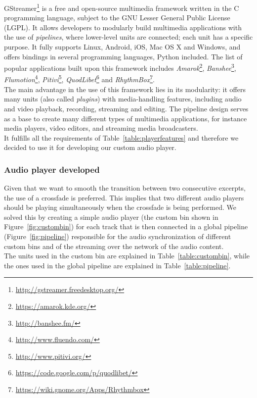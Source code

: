 GStreamer\footnote{\url{http://gstreamer.freedesktop.org/}} is a free and open-source multimedia framework written in the C programming language, subject to the GNU Lesser General Public License (LGPL). It allows developers to modularly build multimedia applications with the use of \textit{pipelines}, where lower-level units are connected; each unit has a specific purpose. It fully supports Linux, Android, iOS, Mac OS X and Windows, and offers bindings in several programming languages, Python included. The list of popular applications built upon this framework includes \textit{Amarok}\footnote{\url{https://amarok.kde.org/}}, \textit{Banshee}\footnote{\url{http://banshee.fm/}}, \textit{Flumotion}\footnote{\url{http://www.fluendo.com/}}, \textit{Pitivi}\footnote{\url{http://www.pitivi.org/}}, \textit{QuodLibet}\footnote{\url{https://code.google.com/p/quodlibet/}} and \textit{RhythmBox}\footnote{\url{https://wiki.gnome.org/Apps/Rhythmbox}}. \\
The main advantage in the use of this framework lies in its modularity: it offers many units (also called \textit{plugins}) with media-handling features, including audio and video playback, recording, streaming and editing. The pipeline design serves as a base to create many different types of multimedia applications, for instance media players, video editors, and streaming media broadcasters. \\ It fulfills all the requirements of Table~\ref{table:playerfeatures} and therefore we decided to use it for developing our custom audio player.


\subsubsection*{Audio player developed}
\label{subsec:audioplayer}
Given that we want to smooth the transition between two consecutive excerpts, the use of a crossfade is preferred. This implies that two different audio players should be playing simultaneously when the crossfade is being performed. We solved this by creating a simple audio player (the custom bin shown in Figure~\ref{fig:custombin}) for each track that is then connected in a global pipeline (Figure~\ref{fig:pipeline}) responsible for the audio synchronization of different custom bins and of the streaming over the network of the audio content. \\ The units used in the custom bin are explained in Table~\ref{table:custombin}, while the ones used in the global pipeline are explained in Table~\ref{table:pipeline}. \\


